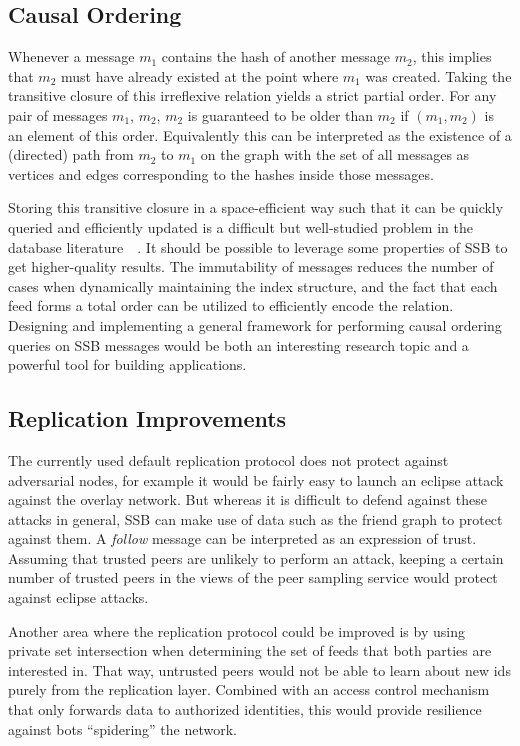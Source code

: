 \documentclass[sigconf]{acmart}
\begin{document}
\subsection{Causal Ordering}

Whenever a message $m_1$ contains the hash of another message $m_2$, this implies that $m_2$ must have already existed at the point where $m_1$ was created. Taking the transitive closure of this irreflexive relation yields a strict partial order. For any pair of messages $m_1$, $m_2$, $m_2$ is guaranteed to be older than $m_2$ if $(m_1, m_2)$ is an element of this order. Equivalently this can be interpreted as the existence of a (directed) path from $m_2$ to $m_1$ on the graph with the set of all messages as vertices and edges corresponding to the hashes inside those messages.

Storing this transitive closure in a space-efficient way such that it can be quickly queried and efficiently updated is a difficult but well-studied problem in the database literature~\cite{jin2012scarab}~\cite{yildirim2013dagger}. It should be possible to leverage some properties of SSB to get higher-quality results. The immutability of messages reduces the number of cases when dynamically maintaining the index structure, and the fact that each feed forms a total order can be utilized to efficiently encode the relation. Designing and implementing a general framework for performing causal ordering queries on SSB messages would be both an interesting research topic and a powerful tool for building applications.

\subsection{Replication Improvements}

The currently used default replication protocol does not protect against adversarial nodes, for example it would be fairly easy to launch an eclipse attack~\cite{singh2006eclipse} against the overlay network. But whereas it is difficult to defend against these attacks in general, SSB can make use of data such as the friend graph to protect against them. A \textit{follow} message can be interpreted as an expression of trust. Assuming that trusted peers are unlikely to perform an attack, keeping a certain number of trusted peers in the views of the peer sampling service would protect against eclipse attacks.

Another area where the replication protocol could be improved is by using private set intersection when determining the set of feeds that both parties are interested in. That way, untrusted peers would not be able to learn about new ids purely from the replication layer. Combined with an access control mechanism that only forwards data to authorized identities, this would provide resilience against bots ``spidering'' the network.
\end{document}

